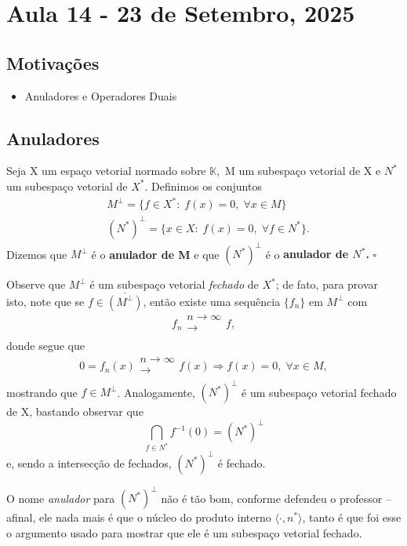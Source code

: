 \documentclass[../functional_analysis.tex]{subfiles}
\begin{document}
\section{Aula 14 - 23 de Setembro, 2025}
\subsection{Motivações}
\begin{itemize}
	\item Anuladores e Operadores Duais
\end{itemize}
\subsection{Anuladores}
\begin{def*}
	Seja X um espaço vetorial normado sobre \(\mathbb{K},\) M um subespaço vetorial de X e \(N^{*}\) um subespaço vetorial de \(X^{*}.\) Definimos os conjuntos
	\begin{align*}
		 & M^{\perp } = \{f\in X^{*}:\; f(x) = 0,\; \forall x\in M\}        \\
		 & (N^{*})^{\perp } = \{x\in X:\; f(x) = 0,\; \forall f\in N^{*}\}.
	\end{align*}
	Dizemos que \(M^{\perp }\) é o \textbf{anulador de M} e que \((N^{*})^{\perp }\) é o \textbf{anulador de \(N^{*}\).} \(\square\)
\end{def*}
Observe que \(M^{\perp }\) é um subespaço vetorial \textit{fechado} de \(X^{*}\); de fato, para provar isto, note que se \(f\in \overline{(M^{\perp })}\), então existe uma sequência \(\{f_{n}\}\) em \(M^{\perp }\) com
\[
	f_{n}\substack{n\to \infty \\ \longrightarrow \\ }f,
\]
donde segue que
\[
	0 = f_{n}(x)\substack{n\to \infty \\ \longrightarrow \\ }f(x) \Rightarrow f(x) = 0,\; \forall x\in M,
\]
mostrando que \(f\in M^{\perp }\). Analogamente, \((N^{*})^{\perp }\) é um subespaço vetorial fechado de X, bastando observar que
\[
	\bigcap_{f\in N^{*}}^{}f^{-1}(0) = (N^{*})^{\perp}
\]
e, sendo a intersecção de fechados, \((N^{*})^{\perp }\) é fechado.

\begin{tcolorbox}[
		skin=enhanced,
		title=Observação,
		fonttitle=\bfseries,
		colframe=black,
		colbacktitle=cyan!75!white,
		colback=cyan!15,
		colbacklower=black,
		coltitle=black,
		drop fuzzy shadow,
	]
	O nome \textit{anulador} para \((N^{*})^{\perp }\) não é tão bom, conforme defendeu o professor -- afinal, ele nada mais é que o núcleo do produto interno \(\langle \cdot , n^{*} \rangle\), tanto é
	que foi esse o argumento usado para mostrar que ele	é um subespaço vetorial fechado.
\end{tcolorbox}
\end{document}
